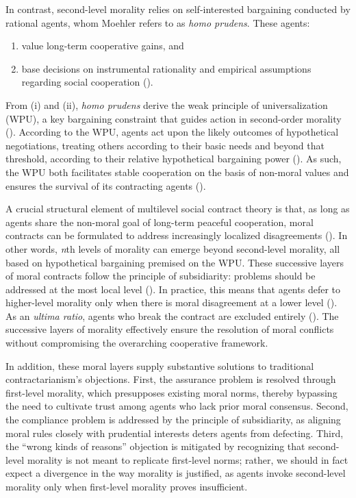 In contrast, second-level morality relies on self-interested bargaining conducted by rational agents, whom Moehler refers to as \emph{homo prudens}. These agents:
\begin{enumerate}

\item value long-term cooperative gains, and

\item base decisions on instrumental rationality and empirical assumptions regarding social cooperation (\cites[p.\ 8, 48]{moehler2020contractarianism}[p.\ 234]{moehler2024diversity}).

\end{enumerate}
From (i) and (ii), \emph{homo prudens} derive the weak principle of universalization (WPU), a key bargaining constraint that guides action in second-order morality (\cite[pp.\ 48–52]{moehler2020contractarianism}). According to the WPU, agents act upon the likely outcomes of hypothetical negotiations, treating others according to their basic needs and beyond that threshold, according to their relative hypothetical bargaining power (\cite[p.\ 50]{moehler2020contractarianism}). As such, the WPU both facilitates stable cooperation on the basis of non-moral values
and ensures the survival of its contracting agents (\cite[p. 50]{moehler2020contractarianism}).

A crucial structural element of multilevel social contract theory is that, as long as agents share the non-moral goal of long-term peaceful cooperation, moral contracts can be formulated to address increasingly localized disagreements (\cite[p.\ 54]{moehler2020contractarianism}). In other words, \emph{n}th levels of morality can emerge beyond second-level morality, all based on hypothetical bargaining premised on the WPU. These successive layers of moral contracts follow the principle of subsidiarity: problems should be addressed at the most local level (\cite{merriamwebster2025}). In practice, this means that agents defer to higher-level morality only when there is moral disagreement at a lower level (\cite[p.\ 235]{moehler2024diversity}). As an \emph{ultima ratio}, agents who break the contract are excluded entirely (\cite[p.\ 58]{moehler2020contractarianism}). The successive layers of morality effectively ensure the resolution of moral conflicts without compromising the overarching cooperative framework.

In addition, these moral layers supply substantive solutions to traditional contractarianism’s objections. First, the assurance problem is resolved through first-level morality, which presupposes existing moral norms, thereby bypassing the need to cultivate trust among agents who lack prior moral consensus. Second, the compliance problem is addressed by the principle of subsidiarity, as aligning moral rules closely with prudential interests deters agents from defecting. Third, the “wrong kinds of reasons” objection is mitigated by recognizing that second-level morality is not meant to replicate first-level norms; rather, we should in fact expect a divergence in the way morality is justified, as agents invoke second-level morality only when first-level morality proves insufficient.

